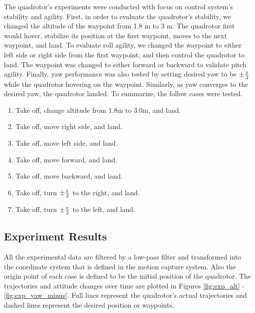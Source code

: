The quadrotor's experiments were conducted with focus on control system's stability and agility. First, in order to evaluate the quadrotor's stability, we changed the altitude of the waypoint from 1.8 m to 3 m. The quadrotor first would hover, stabilize its position at the first waypoint, moves to the next waypoint, and land. To evaluate roll agility, we changed the waypoint to either left side or right side from the first waypoint, and then control the quadrotor to land. The waypoint was changed to either forward or backward to validate pitch agility. Finally, yaw performance was also tested by setting desired yaw to be \( \pm {{\pi}\over{2}}\) while the quadrotor hovering on the waypoint. Similarly, as yaw converges to the desired yaw, the quadrotor landed. To summarize, the follow cases were tested.
\begin{enumerate}
\item Take off, change altitude from 1.8m to 3.0m, and land.
\item Take off, move right side, and land.
\item Take off, move left side, and land.
\item Take off, move forward, and land.
\item Take off, move backward, and land.
\item Take off, turn \( \pm {{\pi}\over2}\) to the right, and land.
\item Take off, turn \( \pm {{\pi}\over2}\) to the left, and land.
\end{enumerate}


\subsection{Experiment Results}
All the experimental data are filtered by a low-pass filter and transformed into the coordinate system that is defined in the motion capture system. Also the origin point of each case is defined to be the initial position of the quadrotor. The trajectories and attitude changes over time are plotted in Figures \ref{fig:exp_alt} - \ref{fig:exp_yaw_minus}. Full lines represent the quadrotor's actual trajectories and dashed lines represent the desired position or waypoints.

